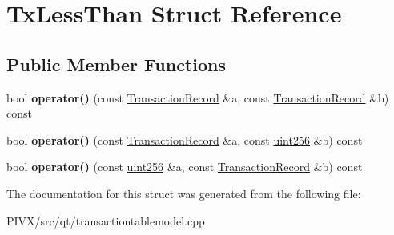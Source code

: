 \hypertarget{struct_tx_less_than}{}\section{Tx\+Less\+Than Struct Reference}
\label{struct_tx_less_than}
\subsection*{Public Member Functions}
\begin{DoxyCompactItemize}
\item 
\mbox{\label{struct_tx_less_than_a3cce66a42f66b3ea9870d54de7e7445a}} 
bool {\bfseries operator()} (const \mbox{\hyperlink{class_transaction_record}{Transaction\+Record}} \&a, const \mbox{\hyperlink{class_transaction_record}{Transaction\+Record}} \&b) const
\item 
\mbox{\label{struct_tx_less_than_a3cf6f43445370a0b1a39f1a820f033cc}} 
bool {\bfseries operator()} (const \mbox{\hyperlink{class_transaction_record}{Transaction\+Record}} \&a, const \mbox{\hyperlink{classuint256}{uint256}} \&b) const
\item 
\mbox{\label{struct_tx_less_than_abc3c26eb0b88cf245e96aa07a1719228}} 
bool {\bfseries operator()} (const \mbox{\hyperlink{classuint256}{uint256}} \&a, const \mbox{\hyperlink{class_transaction_record}{Transaction\+Record}} \&b) const
\end{DoxyCompactItemize}


The documentation for this struct was generated from the following file\+:\begin{DoxyCompactItemize}
\item 
P\+I\+V\+X/src/qt/transactiontablemodel.\+cpp\end{DoxyCompactItemize}
